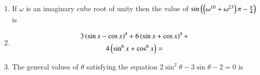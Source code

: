 \documentclass[journal,12pt,twocolumn]{IEEEtran}
\theoremstyle{remark}
\begin{document}
\begin{enumerate}
\begin{enumerate}
        \end{enumerate}

    \item If $\omega$ is an imaginary cube root of unity then the value of $\sin{\ensuremath{\left(\left(\omega^{10} + \omega^{23}\right)\pi - \frac{\pi}{4}\right)}}$ is
    
        \hfill{}
        \begin{enumerate}
        \end{enumerate}

	\item \begin{multline*}
		3\left(\sin{x} - \cos{x}\right)^4 + 6\left(\sin{x} + \cos{x}\right)^4 + \\ 4\left(\sin^6{x}+\cos^6{x}\right) =
	\end{multline*}
        
        \hfill{}
        \begin{enumerate}
        \end{enumerate}   

    \item The general values of $\theta$ satisfying the equation $2\sin^2{\theta}-3\sin{\theta}-2=0$ is
        

\end{enumerate}
\end{document}
